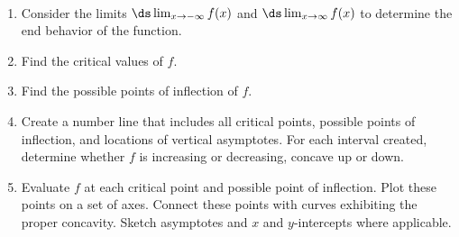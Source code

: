  \addtocounter{keyideaEnv}{-1}
 {~\\[-2\baselineskip]
 \hspace{0pt}\begin{enumerate}[resume=curvesketching] %
\fi
	\item	Consider the limits $\ds\lim_{x\to-\infty}f(x)$ and $\ds\lim_{x\to\infty}f(x)$ to determine the end behavior of the function.
	\item	Find the critical values of $f$.
	\item	Find the possible points of inflection of $f$.
	\item	Create a number line that includes all critical points, possible points of inflection, and locations of vertical asymptotes. For each interval created, determine whether $f$ is increasing or decreasing, concave up or down.
	\item	Evaluate $f$ at each critical point and possible point of inflection. Plot these points on a set of axes. Connect these points with curves exhibiting the proper concavity. Sketch asymptotes and $x$ and $y$-intercepts where applicable.
\end{enumerate}}


